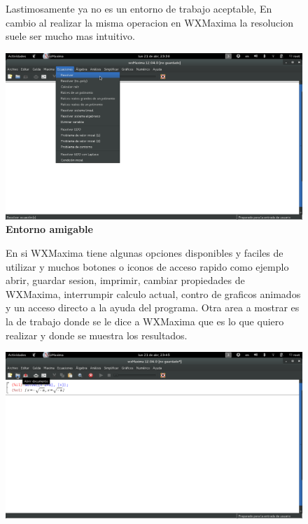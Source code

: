 \documentclass[10pt,a4paper]{book}
\begin{document}
\begin{small}
\begin{figure}[htb]
\begin{center}
\end{center}
Lastimosamente ya no es un entorno de trabajo aceptable, En cambio al realizar la misma operacion en WXMaxima la resolucion suele ser mucho mas intuitivo.
\end{figure}

\begin{figure}[htb]
\begin{center}
\includegraphics[width=13cm]{fotos/cap9.png}
\caption{\textbf{Entorno amigable}}
\end{center}
\end{figure}

\begin{figure}[htb]
En si WXMaxima tiene algunas opciones disponibles y faciles de utilizar y muchos botones o iconos de acceso rapido como ejemplo abrir, guardar sesion, imprimir, cambiar propiedades de WXMaxima, interrumpir calculo actual, contro de graficos animados y un acceso directo a la ayuda del programa.
Otra area a mostrar es la de trabajo donde se le dice a WXMaxima que es lo que quiero realizar y donde se muestra los resultados.
\begin{center}
\includegraphics[width=13cm]{fotos/cap10.png}
\caption{\textbf{ }}
\end{center}
\end{figure}


\end{small}
\end{document}
